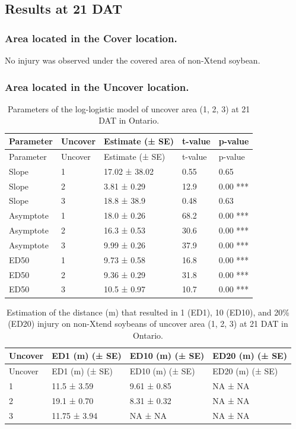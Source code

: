 \documentclass[]{article}
\begin{document}
\newpage

\pagebreak

\subsection{Results at 21 DAT}\label{results-at-21-dat-3}

\subsubsection{\texorpdfstring{Area located in the \textbf{Cover}
location.}{Area located in the Cover location.}}\label{area-located-in-the-cover-location.}

No injury was observed under the covered area of non-Xtend soybean.

\newpage

\pagebreak

\subsubsection{\texorpdfstring{Area located in the \textbf{Uncover}
location.}{Area located in the Uncover location.}}\label{area-located-in-the-uncover-location.}

\begin{longtable}[]{@{}lllll@{}}
\caption{Parameters of the log-logistic model of uncover area (1, 2, 3)
at 21 DAT in Ontario.}\tabularnewline
\toprule
Parameter & Uncover & Estimate (± SE) & t-value & p-value\tabularnewline
\midrule
\endfirsthead
\toprule
Parameter & Uncover & Estimate (± SE) & t-value & p-value\tabularnewline
\midrule
\endhead
Slope & 1 & 17.02 ± 38.02 & 0.55 & 0.65\tabularnewline
Slope & 2 & 3.81 ± 0.29 & 12.9 & 0.00 ***\tabularnewline
Slope & 3 & 18.8 ± 38.9 & 0.48 & 0.63\tabularnewline
Asymptote & 1 & 18.0 ± 0.26 & 68.2 & 0.00 ***\tabularnewline
Asymptote & 2 & 16.3 ± 0.53 & 30.6 & 0.00 ***\tabularnewline
Asymptote & 3 & 9.99 ± 0.26 & 37.9 & 0.00 ***\tabularnewline
ED50 & 1 & 9.73 ± 0.58 & 16.8 & 0.00 ***\tabularnewline
ED50 & 2 & 9.36 ± 0.29 & 31.8 & 0.00 ***\tabularnewline
ED50 & 3 & 10.5 ± 0.97 & 10.7 & 0.00 ***\tabularnewline
\bottomrule
\end{longtable}

\begin{longtable}[]{@{}llll@{}}
\caption{Estimation of the distance (m) that resulted in 1 (ED1), 10
(ED10), and 20\% (ED20) injury on non-Xtend soybeans of uncover area (1,
2, 3) at 21 DAT in Ontario.}\tabularnewline
\toprule
Uncover & ED1 (m) (± SE) & ED10 (m) (± SE) & ED20 (m) (±
SE)\tabularnewline
\midrule
\endfirsthead
\toprule
Uncover & ED1 (m) (± SE) & ED10 (m) (± SE) & ED20 (m) (±
SE)\tabularnewline
\midrule
\endhead
1 & 11.5 ± 3.59 & 9.61 ± 0.85 & NA ± NA\tabularnewline
2 & 19.1 ± 0.70 & 8.31 ± 0.32 & NA ± NA\tabularnewline
3 & 11.75 ± 3.94 & NA ± NA & NA ± NA\tabularnewline
\bottomrule
\end{longtable}
\end{document}
